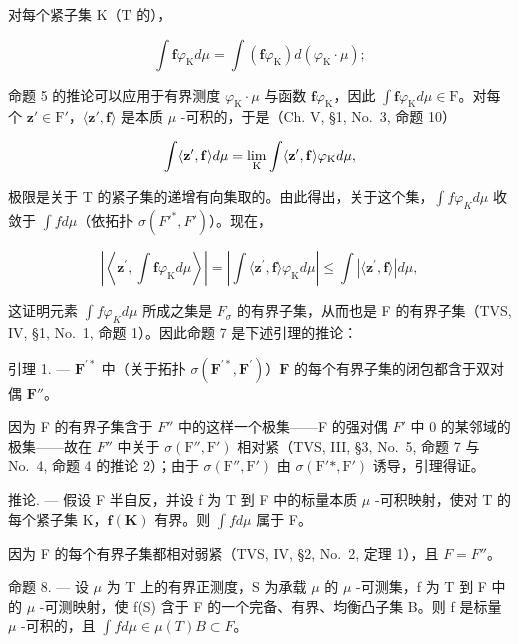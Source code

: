 对每个紧子集 \(\mathrm{K}\)（\(\mathrm{T}\) 的），

\[
\int \mathbf {f} \varphi_ {\mathrm{K}} d \mu = \int (\mathbf {f} \varphi_ {\mathrm{K}}) d (\varphi_ {\mathrm{K}} \cdot \mu);
\]

命题 5 的推论可以应用于有界测度 \(\varphi_{\mathrm{K}} \cdot \mu\) 与函数 \(\mathbf{f}\varphi_{\mathrm{K}}\)，因此 \(\int \mathbf{f}\varphi_{\mathrm{K}} d\mu \in \mathrm{F}\)。对每个 \(\mathbf{z}' \in \mathrm{F}'\)，\(\langle \mathbf{z}', \mathbf{f} \rangle\) 是本质 \(\mu\) -可积的，于是（Ch. V, §1, No.~3, 命题 10）

\[
\int \langle {\bf z} ^ {\prime}, {\bf f} \rangle d \mu = \lim _ {\mathrm{K}} \int \langle {\bf z} ^ {\prime}, {\bf f} \rangle \varphi_ {\mathrm{K}} d \mu ,
\]

极限是关于 T 的紧子集的递增有向集取的。由此得出，关于这个集，\(\int f\varphi_{K}d\mu\) 收敛于 \(\int f d\mu\)（依拓扑 \(\sigma(F'^{*},F')\)）。现在，

\[
\left| \left\langle \mathbf {z} ^ {\prime}, \int \mathbf {f} \varphi_ {\mathrm{K}} d \mu \right\rangle \right| = \left| \int \langle \mathbf {z} ^ {\prime}, \mathbf {f} \rangle \varphi_ {\mathrm{K}} d \mu \right| \leqslant \int | \langle \mathbf {z} ^ {\prime}, \mathbf {f} \rangle | d \mu ,
\]

这证明元素 \(\int f\varphi_{K}d\mu\) 所成之集是 \(F_{\sigma}\) 的有界子集，从而也是 F 的有界子集（TVS, IV, §1, No.~1, 命题 1）。因此命题 7 是下述引理的推论：

引理 1. --- \(\mathbf{F}^{\prime*}\) 中（关于拓扑 \(\sigma(\mathbf{F}^{\prime*},\mathbf{F}^{\prime})\)）\(\mathbf{F}\) 的每个有界子集的闭包都含于双对偶 \(\mathbf{F}''\)。

因为 F 的有界子集含于 \(F''\) 中的这样一个极集——F 的强对偶 \(F'\) 中 0 的某邻域的极集——故在 \(F''\) 中关于 \(\sigma(\mathrm{F}'',\mathrm{F}')\) 相对紧（TVS, III, §3, No.~5, 命题 7 与 No.~4, 命题 4 的推论 2）；由于 \(\sigma(\mathrm{F}'',\mathrm{F}')\) 由 \(\sigma(\mathrm{F}'*,\mathrm{F}')\) 诱导，引理得证。

推论. --- 假设 F 半自反，并设 f 为 T 到 F 中的标量本质 \(\mu\) -可积映射，使对 T 的每个紧子集 K，\(\mathbf{f}(\mathbf{K})\) 有界。则 \(\int f d\mu\) 属于 F。

因为 F 的每个有界子集都相对弱紧（TVS, IV, §2, No.~2, 定理 1），且 \(F = F''\)。

命题 8. --- 设 \(\mu\) 为 T 上的有界正测度，S 为承载 \(\mu\) 的 \(\mu\) -可测集，f 为 T 到 F 中的 \(\mu\) -可测映射，使 f(S) 含于 F 的一个完备、有界、均衡凸子集 B。则 f 是标量 \(\mu\) -可积的，且 \(\int f d\mu \in \mu(T)B \subset F\)。

